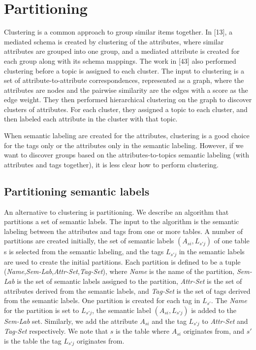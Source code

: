 \section{Partitioning}
\label{sec:Partitioning}

Clustering is a common approach to group similar items together. In \cite{ilprints851}[13], a mediated schema is created by clustering of the attributes, where similar attributes are grouped into one group, and a mediated attribute is created for each group along with its schema mappings. The work in \cite{Smith2011Unity}[43] also performed clustering before a topic is assigned to each cluster. The input to clustering is a set of attribute-to-attribute correspondences, represented as a graph, where the attributes are nodes and the pairwise similarity are the edges with a score as the edge weight. They then performed hierarchical clustering on the graph to discover clusters of attributes. For each cluster, they assigned a topic to each cluster, and then labeled each attribute in the cluster with that topic.

When semantic labeling are created for the attributes, clustering is a good choice for the tags only or the attributes only in the semantic labeling. However, if we want to discover groups based on the attributes-to-topics semantic labeling (with attributes and tags together), it is less clear how to perform clustering.

\subsection{Partitioning semantic labels}
\label{ssec:PartitioningSemanticLabels}

An alternative to clustering is partitioning. We describe an algorithm that partitions a set of semantic labels. The input to the algorithm is the semantic labeling between the attributes and tags from one or more tables. A number of partitions are created initially, the set of semantic labels $(A_{si},L_{s'j})$ of one table s is selected from the semantic labeling, and the tags $L_{s'j}$ in the semantic labels are used to create the initial partitions. Each partition is defined to be a tuple (\textit{Name},\textit{Sem-Lab},\textit{Attr-Set},\textit{Tag-Set}), where \textit{Name} is the name of the partition, \textit{Sem-Lab} is the set of semantic labels assigned to the partition, \textit{Attr-Set} is the set of attributes derived from the semantic labels, and \textit{Tag-Set} is the set of tags derived from the semantic labels. One partition is created for each tag in $L_{s'}$. The \textit{Name} for the partition is set to $L_{s'j}$, the semantic label $(A_{si},L_{s'j})$ is added to the \textit{Sem-Lab} set. Similarly, we add the attribute $A_{si}$ and the tag $L_{s'j}$ to \textit{Attr-Set} and \textit{Tag-Set} respectively. We note that $s$ is the table where $A_{si}$ originates from, and $s'$ is the table the tag $L_{s'j}$ originates from.

